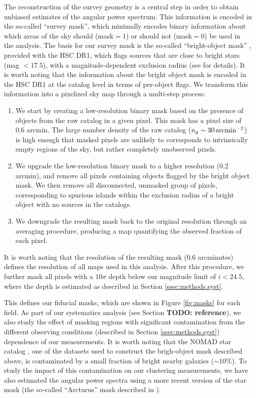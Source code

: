 \documentclass[a4paper,11pt]{article}
\newcommand{\todo}[1]{{\bf TODO: #1}}
\begin{document}
    The reconstruction of the survey geometry is a central step in order to obtain unbiased estimates of the angular power spectrum. This information is encoded in the so-called ``survey mask'', which minimally encodes binary information about which areas of the sky should (mask$=1$) or should not (mask$=0$) be used in the analysis. The basis for our survey mask is the so-called ``bright-object mask'' \cite{2018PASJ...70S...7C}, provided with the HSC DR1, which flags sources that are close to bright stars (mag $<17.5$), with a magnitude-dependent exclusion radius (see \cite{2018PASJ...70S...7C} for details). It is worth noting that the information about the bright object mask is encoded in the HSC DR1 at the catalog level in terms of per-object flags. We transform this information into a pixelized sky map through a multi-step process:
    \begin{enumerate}
      \item We start by creating a low-resolution binary mask based on the presence of objects from the raw catalog in a given pixel. This mask has a pixel size of 0.6 arcmin. The large number density of the raw catalog  ($n_g\sim30\,{\rm arcmin}^{-2}$) is high enough that masked pixels are unlikely to corresponds to intrinsically empty regions of the sky, but rather completely unobserved pixels.
      \item We upgrade the low-resolution binary mask to a higher resolution (0.2 arcmin), and remove all pixels containing objects flagged by the bright object mask. We then remove all disconnected, unmasked group of pixels, corresponding to spurious islands within the exclusion radius of a bright object with no sources in the catalogs.
      \item We downgrade the resulting mask back to the original resolution through an averaging procedure, producing a map quantifying the observed fraction of each pixel.
    \end{enumerate}
    It is worth noting that the resolution of the resulting mask ($0.6$ arcminutes) defines the resolution of all maps used in this analysis. After this procedure, we further mask all pixels with a $10\sigma$ depth below our magnitude limit of $i<24.5$, where the depth is estimated as described in Section \ref{ssec:methods.syst}.
    
    This defines our fiducial masks, which are shown in Figure \ref{fig:masks} for each field. As part of our systematics analysis (see Section \todo{reference}), we also study the effect of masking regions with significant contamination from the different observing conditions (described in Section \ref{ssec:methods.syst}) dependence of our measurements. It is worth noting that the NOMAD star catalog \cite{2004AAS...205.4815Z}, one of the datasets used to construct the brigh-object mask described above, is contaminated by a small fraction of bright nearby galaxies ($\sim10\%$). To study the impact of this contamination on our clustering measurements, we have also estimated the angular power spectra using a more recent version of the star mask (the so-called ``Arcturus'' mask described in \cite{2018PASJ...70S...7C}).
\end{document}
